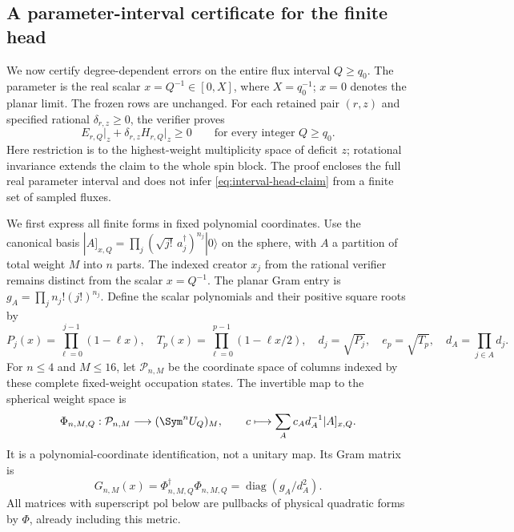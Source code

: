 \subsection{A parameter-interval certificate for the finite head}
\label{sec:optimized-head-interval}

We now certify degree-dependent errors on the entire flux interval
$Q\ge q_0$. The parameter is the real scalar $x=Q^{-1}\in[0,X]$, where
$X=q_0^{-1}$; $x=0$ denotes the planar limit. The frozen rows are unchanged.
For each retained pair $(r,z)$ and specified rational $\delta_{r,z}\ge0$,
the verifier proves
\begin{equation}\label{eq:interval-head-claim}
 E_{r,Q}\big|_z+\delta_{r,z}H_{r,Q}\big|_z\ge0
 \qquad\text{for every integer }Q\ge q_0.
\end{equation}
Here restriction is to the highest-weight multiplicity space of deficit
$z$; rotational invariance extends the claim to the whole spin block.
The proof encloses the full real parameter interval and does not infer
\eqref{eq:interval-head-claim} from a finite set of sampled fluxes.

We first express all finite forms in fixed polynomial coordinates. Use
the canonical basis $|A]_{x,Q}=\prod_j(\sqrt{j!}\,a_j^\dagger)^{n_j}|0\rangle$
on the sphere, with $A$ a partition of total weight $M$ into $n$ parts.
The indexed creator $x_j$ from the rational verifier remains distinct from
the scalar $x=Q^{-1}$. The planar Gram entry is
$g_A=\prod_jn_j!(j!)^{n_j}$. Define the scalar polynomials and their
positive square roots by
\begin{equation}\label{eq:interval-scalar-products}
 P_j(x)=\prod_{\ell=0}^{j-1}(1-\ell x),\quad
 T_p(x)=\prod_{\ell=0}^{p-1}(1-\ell x/2),\quad
 d_j=\sqrt{P_j},\quad e_p=\sqrt{T_p},\quad
 d_A=\prod_{j\in A}d_j.
\end{equation}
For $n\le4$ and $M\le16$, let $\mathcal P_{n,M}$ be the coordinate
space of columns indexed by these complete fixed-weight occupation
states. The invertible map to the spherical weight space is
\begin{equation}\label{eq:interval-polynomial-map}
 \Phi_{n,M,Q}:\mathcal P_{n,M}\longrightarrow
       (\Sym^nU_Q)_M,
 \qquad c\longmapsto\sum_Ac_A d_A^{-1}|A]_{x,Q}.
\end{equation}
It is a polynomial-coordinate identification, not a unitary map. Its
Gram matrix is
\begin{equation}\label{eq:interval-metric}
 G_{n,M}(x)=\Phi_{n,M,Q}^\dagger\Phi_{n,M,Q}
          =\operatorname{diag}(g_A/d_A^2).
\end{equation}
All matrices with superscript $\mathrm{pol}$ below are pullbacks of
physical quadratic forms by $\Phi$, already including this metric.

